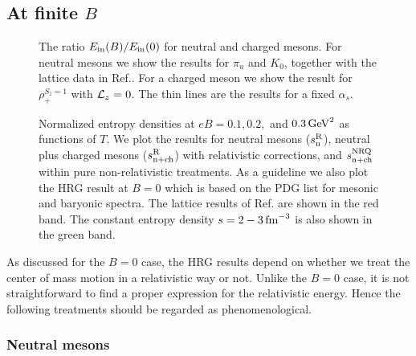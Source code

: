 \subsection{At finite $B$}
\label{sec:HRG_finite_B}

\begin{figure}
\caption{ 
The ratio $E_{\rm in}(B)/E_{\rm in}(0)$ for neutral and charged mesons.
For neutral mesons we show the results for $\pi_u$ and $K_0$, together with the lattice data in Ref.\cite{Ding:2020hxw}.
For a charged meson we show the result for $\rho_+^{S_z=1}$ with $\mathcal{L}_z=0$.
The thin lines are the results for a fixed $\alpha_s$.
}
\label{fig:mass_fixed_alpha}       
\end{figure}


\begin{figure*}

\vspace{-0.3cm}
\begin{center}
\end{center}
\vspace{-0.3cm}
\caption{Normalized entropy densities at $eB=0.1, 0.2,$ and $0.3\, {\rm GeV}^2$ as functions of $T$. 
We plot the results for neutral mesons ($s_{\rm n}^{\rm R}$), neutral plus charged mesons ($s_{\rm n+ch}^{\rm R}$) with relativistic corrections, and $s_{\rm n+ch}^{\rm NRQ}$ within pure non-relativistic treatments.
As a guideline we also plot the HRG result at $B=0$ which is based on the PDG list for mesonic and baryonic spectra.
The lattice results of Ref.\cite{Bali:2014kia} are shown in the red band.
The constant entropy density $s=2-3\,{\rm fm}^{-3}$ is also shown in the green band.
}
\label{fig:entropy_at_finite_Bs}       
\end{figure*}


As discussed for the $B=0$ case,
the HRG results depend on whether we treat the center of mass motion in a relativistic way or not.
Unlike the $B=0$ case, it is not straightforward to find a proper expression for the relativistic energy.
Hence the following treatments should be regarded as phenomenological.

\subsubsection{Neutral mesons}
\label{sec:HRG_neutral_mesons}

